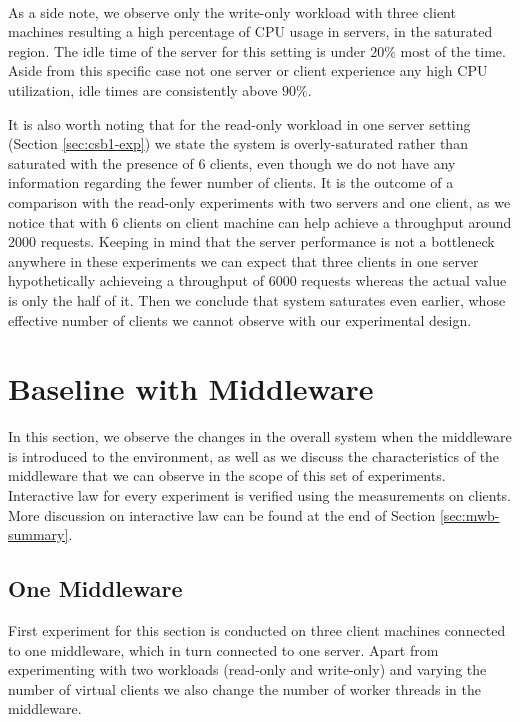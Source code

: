 \documentclass[11pt,a4paper]{article}
\begin{document}
\\
\par As a side note, we observe only the write-only workload with three client machines resulting a high percentage of CPU usage in servers, in the saturated region. The idle time of the server for this setting is under $20\%$ most of the time. Aside from this specific case not one server or client experience any high CPU utilization, idle times are consistently above $90\%$.
\par It is also worth noting that for the read-only workload in one server setting (Section \ref{sec:csb1-exp}) we state the system is overly-saturated rather than saturated with the presence of 6 clients, even though we do not have any information regarding the fewer number of clients. It is the outcome of a comparison with the read-only experiments with two servers and one client, as we notice that with 6 clients on client machine can help achieve a throughput around 2000 requests. Keeping in mind that the server performance is not a bottleneck anywhere in these experiments we can expect that three clients in one server hypothetically achieveing a throughput of 6000 requests whereas the actual value is only the half of it. Then we conclude that system saturates even earlier, whose effective number of clients we cannot observe with our experimental design.

\section{Baseline with Middleware} \label{sec:mwb}
In this section, we observe the changes in the overall system when the middleware is introduced to the environment, as well as we discuss the characteristics of the middleware that we can observe in the scope of this set of experiments. Interactive law for every experiment is verified using the measurements on clients. More discussion on interactive law can be found at the end of Section \ref{sec:mwb-summary}.

\subsection{One Middleware} \label{sec:mwb1}
First experiment for this section is conducted on three client machines connected to one middleware, which in turn connected to one server. Apart from experimenting with two workloads (read-only and write-only) and varying the number of virtual clients we also change the number of worker threads in the middleware.
\end{document}
